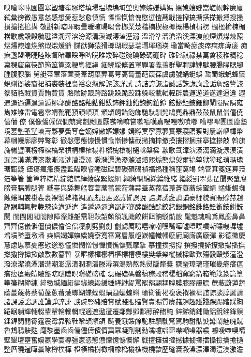 嗅嗆嗥嗉園圓塞塑塘塗塚塔填塌塭塊塢塒塋奧嫁嫉嫌媾媽
媼媳嫂媲嵩嵯幌幹廉廈弒彙徬微愚意慈感想愛惹愁愈慎慌
慄慍愾愴愧愍愆愷戡戢搓搾搞搪搭搽搬搏搜搔損搶搖搗搆
敬斟新暗暉暇暈暖暄暘暍會榔業楚楷楠楔極椰概楊楨楫楞
楓楹榆楝楣楛歇歲毀殿毓毽溢溯滓溶滂源溝滇滅溥溘溼溺
溫滑準溜滄滔溪溧溴煎煙煩煤煉照煜煬煦煌煥煞煆煨煖爺
牒猷獅猿猾瑯瑚瑕瑟瑞瑁琿瑙瑛瑜當畸瘀痰瘁痲痱痺痿
痴痳盞盟睛睫睦睞督睹睪睬睜睥睨睢矮碎碰碗碘碌碉硼碑
碓硿祺祿禁萬禽稜稚稠稔稟稞窟窠筷節筠筮筧粱粳粵經絹
綑綁綏絛置罩罪署義羨群聖聘肆肄腱腰腸腥腮腳腫腹腺腦
舅艇蒂葷落萱葵葦葫葉葬葛萼萵葡董葩葭葆虞虜號蛹蜓蜈
蜇蜀蛾蛻蜂蜃蜆蜊衙裟裔裙補裘裝裡裊裕裒覜解詫該詳試
詩詰誇詼詣誠話誅詭詢詮詬詹詻訾詨豢貊貉賊資賈賄貲賃
賂賅跡跟跨路跳跺跪跤跦躲較載軾輊辟農運遊道遂達逼違
遐遇遏過遍遑逾遁鄒鄗酬酪酩釉鈷鉗鈸鈽鉀鈾鉛鉋鉤鉑鈴
鉉鉍鉅鈹鈿鉚閘隘隔隕雍雋雉雊雷電雹零靖靴靶預頑頓頊
頒頌飼飴飽飾馳馱馴髡鳩麂鼎⿍鼓⿎鼠⿏僧僮僥僖僭僚
僕像僑僱僎僩兢凳劃劂匱厭嗾嘀嘛嘗嗽嘔嘆嘉嘍嘎嗷嘖嘟
嘈嘐嗶團圖塵塾境墓墊塹墅塽壽夥夢夤奪奩嫡嫦嫩嫗嫖嫘
嫣孵寞寧寡寥實寨寢寤察對屢嶄嶇幛幣幕幗幔廓廖弊彆彰
徹慇愿態慷慢慣慟慚慘慵截撇摘摔撤摸摟摺摑摧搴摭摻敲
斡旗旖暢暨暝榜榨榕槁榮槓構榛榷榻榫榴槐槍榭槌榦槃榣
歉歌氳漳演滾漓滴漩漾漠漬漏漂漢滿滯漆漱漸漲漣漕漫漯
澈漪滬漁滲滌滷熔熙煽熊熄熒爾犒犖獄獐瑤瑣瑪瑰瑭甄疑
瘧瘍瘋瘉瘓盡監瞄睽睿睡磁碟碧碳碩碣禎福禍種稱窪窩竭
端管箕箋筵算箝箔箏箸箇箄粹粽精綻綰綜綽綾綠緊綴網
綱綺綢綿綵綸維緒緇綬罰翠翡翟聞聚肇腐膀膏膈膊腿膂
臧臺與舔舞艋蓉蒿蓆蓄蒙蒞蒲蒜蓋蒸蓀蓓蒐蒼蓑蓊蜿蜜蜻
蜢蜥蜴蜘蝕蜷蜩裳褂裴裹裸製裨褚裯誦誌語誣認誡誓誤說
誥誨誘誑誚誧豪貍貌賓賑賒赫趙趕跼輔輒輕輓辣遠遘遜遣
遙遞遢遝遛鄙鄘鄞酵酸酷酴鉸銬銀銅銘銖鉻銓銜銨鉼銑閡
閨閩閣閥閤隙障際雌雒需靼鞅韶頗領颯颱餃餅餌餉駁骯骰
髦魁魂鳴鳶鳳麼鼻⿐齊⿑億儀僻僵價儂儈儉儅凜劇劈劉劍
劊勰厲嘮嘻嘹嘲嘿嘴嘩噓噎噗噴嘶嘯嘰墀墟增墳墜墮墩墦
奭嬉嫻嬋嫵嬌嬈寮寬審寫層履嶝嶔幢幟幡廢廚廟廝廣廠彈
影德徵慶慧慮慝慕憂慼慰慫慾憧憐憫憎憬憚憤憔憮戮摩摯
摹撞撲撈撐撰撥撓撕撩撒撮播撫撚撬撙撢撳敵敷數暮暫
暴暱樣樟槨樁樞標槽模樓樊槳樂樅槭樑歐歎殤毅毆漿潼澄
潑潦潔澆潭潛潸潮澎潺潰潤澗潘滕潯潠潟熟熬熱熨牖犛獎
獗瑩璋璃瑾璀畿瘠瘩瘟瘤瘦瘡瘢皚皺盤瞎瞇瞌瞑瞋磋磅確
磊碾磕碼磐稿稼穀稽稷稻窯窮箭箱範箴篆篇篁箠篌糊締練
緯緻緘緬緝編緣線緞緩綞緙緲緹罵罷羯翩耦膛膜膝膠膚膘
蔗蔽蔚蓮蔬蔭蔓蔑蔣蔡蔔蓬蔥蓿蔆螂蝴蝶蝠蝦蝸蝨蝙蝗蝌
蝓衛衝褐複褒褓褕褊誼諒談諄誕請諸課諉諂調誰論諍誶誹
諛豌豎豬賠賞賦賤賬賭賢賣賜質賡赭趟趣踫踐踝踢踏踩踟
踡踞躺輝輛輟輩輦輪輜輞輥適遮遨遭遷鄰鄭鄧鄱醇醉醋醃
鋅銻銷鋪鋤鋁銳銼鋒鋇鋰銲閭閱霄霆震霉靠鞍鞋鞏頡頫頜
颳養餓餒餘駝駐駟駛駑駕駒駙骷髮髯鬧魅魄魷魯鴆鴉鴃麩
麾黎墨⿒齒儒儘儔儐儕冀冪凝劑劓勳噙噫噹噩噤噸噪器噥
噱噯噬噢噶壁墾壇壅奮嬝嬴學寰導彊憲憑憩憊懍憶憾懊懈
戰擅擁擋撻撼據擄擇擂操撿擒擔撾整曆曉暹曄曇暸樽樸樺
橙橫橘樹橄橢橡橋橇樵機橈歙歷氅濂澱澡濃澤濁澧澳激澹
